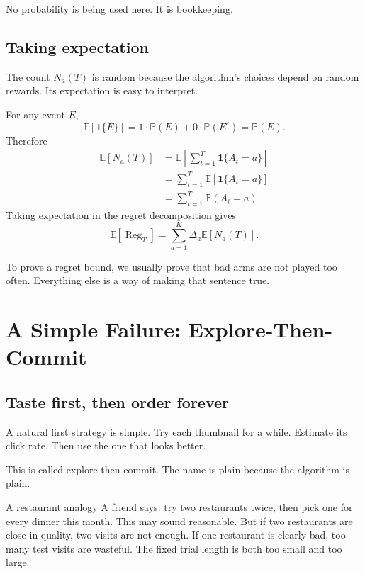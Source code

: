 \documentclass[en,nofont,11pt]{elegantbook}
\newcommand{\E}{\mathbb{E}}
\newcommand{\Pp}{\mathbb{P}}
\newcommand{\ind}{\mathbf{1}}
\providecommand{\Reg}{\operatorname{Reg}}
\begin{document}
No probability is being used here. It is bookkeeping.

\section{Taking expectation}

The count $N_a(T)$ is random because the algorithm's choices depend on random rewards. Its expectation is easy to interpret.

For any event $E$,
\[
\E[\ind\{E\}]
=1\cdot\Pp(E)+0\cdot\Pp(E^c)
=\Pp(E).
\]
Therefore
\[
\begin{aligned}
\E[N_a(T)]
&=\E\left[\sum_{t=1}^T\ind\{A_t=a\}\right]\\
&=\sum_{t=1}^T\E[\ind\{A_t=a\}]\\
&=\sum_{t=1}^T\Pp(A_t=a).
\end{aligned}
\]
Taking expectation in the regret decomposition gives
\[
\E[\Reg_T]
=
\sum_{a=1}^K\Delta_a\E[N_a(T)].
\]

\begin{takeawaybox}
To prove a regret bound, we usually prove that bad arms are not played too often. Everything else is a way of making that sentence true.
\end{takeawaybox}
\chapter{A Simple Failure: Explore-Then-Commit}

\section{Taste first, then order forever}

A natural first strategy is simple. Try each thumbnail for a while. Estimate its click rate. Then use the one that looks better.

This is called explore-then-commit. The name is plain because the algorithm is plain.

\begin{storybox}{A restaurant analogy}
A friend says: try two restaurants twice, then pick one for every dinner this month. This may sound reasonable. But if two restaurants are close in quality, two visits are not enough. If one restaurant is clearly bad, too many test visits are wasteful. The fixed trial length is both too small and too large.
\end{storybox}
\end{document}
